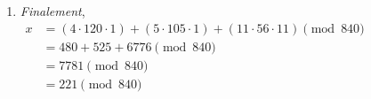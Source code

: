 \begin{solution}
\begin{enumerate}
        \(
        \begin{aligned}
            4 - 3 \cdot 1 &= 1 \\
            4 - (11 - 4 \cdot 2) \cdot 1 &= 1 \\
            4 \cdot 3 - 11 \cdot 1 &= 1 \\
            (15 - 11 \cdot 1) \cdot 3 - 11 \cdot 1 &= 1 \\
            15 \cdot 3 - 11 \cdot 4 &= 1
        \end{aligned}
        \)

        On trouve donc finalement $y = -4 \pmod{15}$ $y = 11 \pmod{15}$. \\

        \item \textit{Finalement}, \\
        \( \begin{aligned}
            x &= (4 \cdot 120 \cdot 1) + (5 \cdot 105 \cdot 1) + (11 \cdot 56 \cdot 11) \pmod{840} \\
            &= 480 + 525 + 6776 \pmod{840} \\
            &= 7781 \pmod{840} \\
            &= 221 \pmod{840} \\
        \end{aligned} 
        \)
        
    \end{enumerate}
    
\end{solution}
